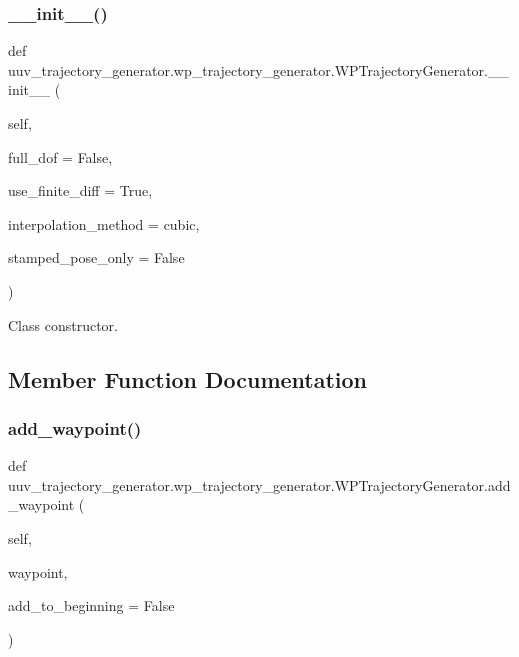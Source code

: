 \subsubsection{\texorpdfstring{\+\_\+\+\_\+init\+\_\+\+\_\+()}{\_\_init\_\_()}}
{\footnotesize\ttfamily def uuv\+\_\+trajectory\+\_\+generator.\+wp\+\_\+trajectory\+\_\+generator.\+W\+P\+Trajectory\+Generator.\+\_\+\+\_\+init\+\_\+\+\_\+ (\begin{DoxyParamCaption}\item[{}]{self,  }\item[{}]{full\+\_\+dof = {\ttfamily False},  }\item[{}]{use\+\_\+finite\+\_\+diff = {\ttfamily True},  }\item[{}]{interpolation\+\_\+method = {\ttfamily \textquotesingle{}cubic\textquotesingle{}},  }\item[{}]{stamped\+\_\+pose\+\_\+only = {\ttfamily False} }\end{DoxyParamCaption})}

\begin{DoxyVerb}Class constructor.\end{DoxyVerb}
 

\subsection{Member Function Documentation}
\mbox{\label{classuuv__trajectory__generator_1_1wp__trajectory__generator_1_1WPTrajectoryGenerator_a82927f85ed2ef82ae6bc5bb43baddd85}} 
\subsubsection{\texorpdfstring{add\+\_\+waypoint()}{add\_waypoint()}}
{\footnotesize\ttfamily def uuv\+\_\+trajectory\+\_\+generator.\+wp\+\_\+trajectory\+\_\+generator.\+W\+P\+Trajectory\+Generator.\+add\+\_\+waypoint (\begin{DoxyParamCaption}\item[{}]{self,  }\item[{}]{waypoint,  }\item[{}]{add\+\_\+to\+\_\+beginning = {\ttfamily False} }\end{DoxyParamCaption})}

